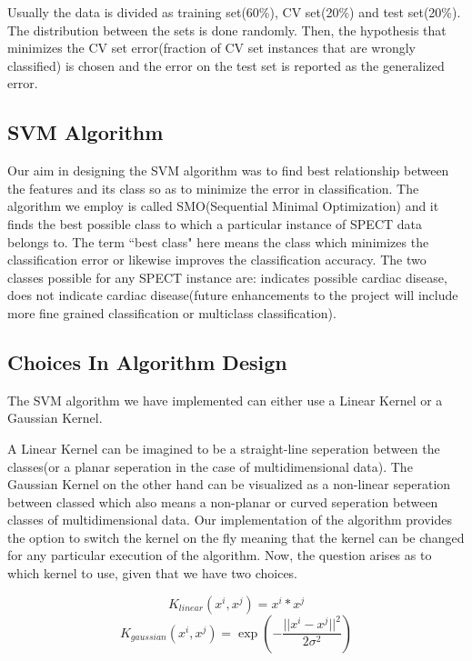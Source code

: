 \documentclass{acm_proc_article-sp}
\begin{document}
Usually the data is divided as training set(60\%), CV set(20\%) and test set(20\%). The distribution between the sets is done randomly. Then, the hypothesis that minimizes the CV set error(fraction of CV set instances that are wrongly classified) is chosen and the error on the test set is reported as the generalized error.

\subsection{SVM Algorithm}

Our aim in designing the SVM algorithm was to find best relationship between the features and its class so as to minimize the error in classification. The algorithm we employ is called SMO(Sequential Minimal Optimization) and it finds the best possible class to which a particular instance of SPECT data belongs to. The term ``best class" here means the class which minimizes the classification error or likewise improves the classification accuracy. The two classes possible for any SPECT instance are: indicates possible cardiac disease, does not indicate cardiac disease(future enhancements to the project will include more fine grained classification or multiclass classification).

\subsection{Choices In Algorithm Design}

The SVM algorithm we have implemented can either use a Linear Kernel or a Gaussian Kernel. 

A Linear Kernel can be imagined to be a straight-line seperation between the classes(or a planar seperation in the case of multidimensional data). The Gaussian Kernel on the other hand can be visualized as a non-linear seperation between classed which also means a non-planar or curved seperation between classes of multidimensional data. Our implementation of the algorithm provides the option to switch the kernel on the fly meaning that the kernel can be changed for any particular execution of the algorithm. Now, the question arises as to which kernel to use, given that we have two choices.

\begin{equation}K_{linear}(x^i, x^j) = x^i * x^j\end{equation}
\begin{equation}K_{gaussian}(x^i, x^j) = \exp(-\frac{||x^i - x^j||^2}{2\sigma^2})\end{equation}
\end{document}

